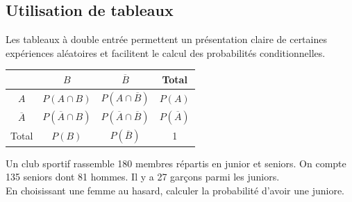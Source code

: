 \documentclass[a4paper,11pt,cours]{nsi} %
\begin{document}
\subsection{Utilisation de tableaux}
Les tableaux à double entrée permettent un présentation claire de certaines expériences aléatoires et facilitent le calcul des probabilités conditionnelles.

\begin{center}
	\begin{tabular}{|c|c|c|c|}
		\hline
		 \rowcolor{UGLiOrange}& $B$ & $\overline{B}$ & Total\\
		 \hline
		 \cellcolor{UGLiOrange}$A$ & $P(A\cap B) $ & $P(A \cap \overline{B})$ & $P(A)$\\
		 \hline
		 \cellcolor{UGLiOrange}$\overline{A}$ & $P(\overline{A}\cap B)$ & $P(\overline{A}\cap \overline{B})$ & $P(\overline{A})$\\
		 \hline
		 \cellcolor{UGLiOrange}Total & $P(B)$ & $P(\overline{B})$ & 1\\
		 \hline
	\end{tabular}
\end{center}

\begin{exercice}[ ]
	Un club sportif rassemble 180 membres répartis en junior et seniors. On compte 135 seniors dont 81 hommes. Il y a 27 garçons parmi les juniors.\\
	En choisissant une femme au hasard, calculer la probabilité d'avoir une juniore.	
\end{exercice}
\end{document}
